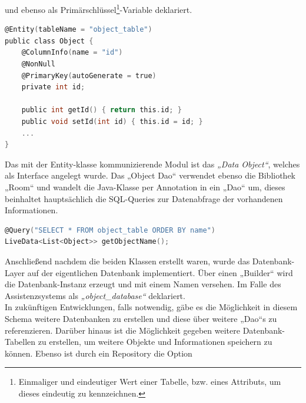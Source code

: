 und ebenso als Primärschlüssel\footnote{Einmaliger und eindeutiger Wert einer Tabelle, bzw. eines Attributs, um dieses eindeutig zu kennzeichnen.}-Variable 
deklariert.
\\ 
\linebreak
\begin{lstlisting}[language=C,
    frame=lines,           % Ein Rahmen um den Code (single for box, lines for top and bottom)
    xleftmargin=\parindent,  % Rahmen link von den Zahlen
    style=algoBericht,
    label={code:entity},
    captionpos=b,           % Caption unter den Code setzen
caption={Entity Code zur Initialisierung der Objekte}]
@Entity(tableName = "object_table")
public class Object {
    @ColumnInfo(name = "id")
    @NonNull
    @PrimaryKey(autoGenerate = true)
    private int id;

    public int getId() { return this.id; }
    public void setId(int id) { this.id = id; }
    ... 
}
\end{lstlisting}
\pagebreak
Das mit der Entity-klasse kommunizierende Modul ist das \textit{„Data Object“}, welches als Interface angelegt wurde. Das „Object Dao“ verwendet ebenso die Bibliothek 
„Room“ und wandelt die Java-Klasse per Annotation in ein „Dao“ um, dieses beinhaltet hauptsächlich die SQL-Queries zur Datenabfrage der vorhandenen Informationen. 
\\
\linebreak
\begin{lstlisting}[language=C,
    frame=lines,           % Ein Rahmen um den Code (single for box, lines for top and bottom)
    xleftmargin=\parindent,  % Rahmen link von den Zahlen
    style=algoBericht,
    label={code:query},
    captionpos=b,           % Caption unter den Code setzen
caption={SQL-Query zur Abfrage der Objekt-Namen}]
@Query("SELECT * FROM object_table ORDER BY name")
LiveData<List<Object>> getObjectName();
\end{lstlisting}
Anschließend nachdem die beiden Klassen erstellt waren, wurde das Datenbank-Layer auf der eigentlichen Datenbank implementiert. Über einen „Builder“ wird die 
Datenbank-Instanz erzeugt und mit einem Namen versehen. Im Falle des Assistenzsystems als \textit{„object\_database“} deklariert. 
\\ 
In zukünftigen Entwicklungen, 
falls notwendig, gäbe es die Möglichkeit in diesem Schema weitere Datenbanken zu erstellen und diese über weitere „Dao“s zu referenzieren. Darüber hinaus ist die 
Möglichkeit gegeben weitere Datenbank-Tabellen zu erstellen, um weitere Objekte und Informationen speichern zu können. Ebenso ist durch ein Repository die Option 
